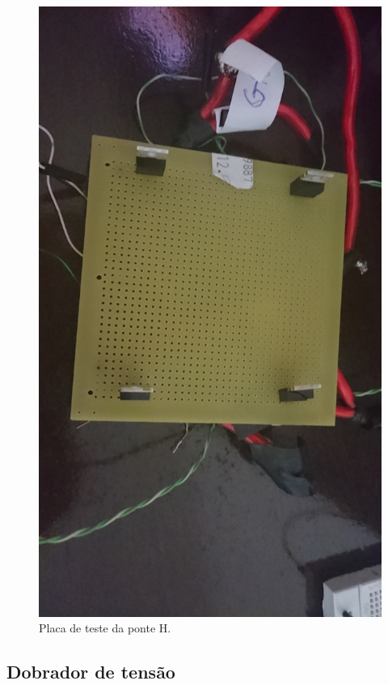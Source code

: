 \begin{figure}[h!]
  \centering
  \includegraphics[width=1.0\textwidth]{figuras/TestePonteH.JPG}
  \caption{Placa de teste da ponte H.}
\end{figure}

\subsection{Dobrador de tensão}

